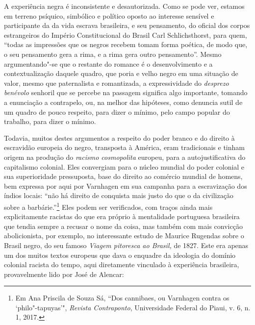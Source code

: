 A experiência negra é inconsistente e desautorizada. Como se pode ver,
estamos em terreno psíquico, simbólico e político oposto ao interesse
sensível e participante da da vida escrava brasileira, e seu pensamento,
do oficial dos corpos estrangeiros do Império Constitucional do Brasil
Carl Schlichsthorst, para quem, ``todas as impressões que os negros
recebem tomam forma poética, de modo que, o seu pensamento gera a rima,
e a rima gera outro pensamento''. Mesmo argumentando"-se que o restante
do romance é o desenvolvimento e a contextualização daquele quadro, que
poria e velho negro em uma situação de valor, mesmo que paternalista e
romantizada, a expressividade do \emph{desprezo benévolo} senhoril que
se percebe na passagem significa algo importante, tomando a enunciação a
contrapelo, ou, na melhor das hipóteses, como denuncia sutil de um
quadro de pouco respeito, para dizer o mínimo, pelo campo popular do
trabalho, para dizer o mínimo.

Todavia, muitos destes argumentos a respeito do poder branco e do
direito à escravidão europeia do negro, transposta à América, eram
tradicionais e tinham origem na produção do \emph{racismo cosmopolita}
europeu, para a autojustificativa do capitalismo colonial. Eles
convergiam para o núcleo mundial do poder colonial e sua superioridade
pressuposta, base do direito ao comércio mundial de homens, bem expressa
por aqui por Varnhagen em sua campanha para a escravização dos índios
locais: ``não há direito de conquista mais justo do que o da civilização
sobre a barbárie.''\footnote{Em Ana Priscila de Souza Sá, ``Dos
  cannibaes, ou Varnhagen contra os `philo"-tapuyas'", \emph{Revista
    Contraponto}, Universidade Federal do Piaui, v. 6, n. 1, 2017.} Eles
podem ser verificados, com traços ainda mais explicitamente racistas do
que era próprio à mentalidade portuguesa brasileira que tendia sempre a
recusar o nome da coisa, mas também com mais convicção abolicionista,
por exemplo, no interessante estudo de Maurice Rugendas sobre o Brasil
negro, do seu famoso \emph{Viagem pitoresca ao Brasil,} de 1827. Este
era apenas um dos muitos textos europeus que dava o enquadre da
ideologia do domínio colonial racista do tempo, aqui diretamente
vinculado à experiência brasileira, provavelmente lido por José de
Alencar:

